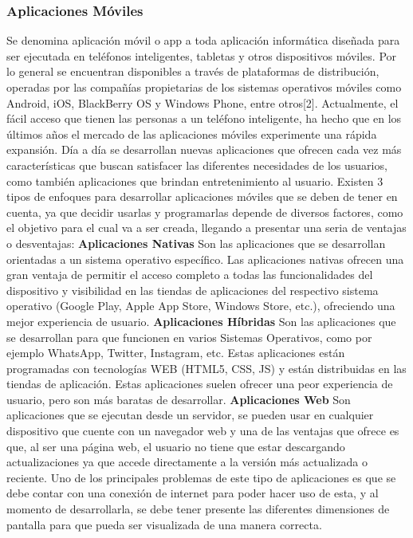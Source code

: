 \documentclass[12pt,letterpaper,openany]{book}
\begin{document}
\subsubsection{Aplicaciones Móviles}
Se denomina aplicación móvil o app a toda aplicación informática diseñada para ser ejecutada en teléfonos inteligentes, tabletas y otros dispositivos móviles. Por lo general se encuentran disponibles a través de plataformas de distribución, operadas por las compañías propietarias de los sistemas operativos móviles como Android, iOS, BlackBerry OS y Windows Phone, entre otros[2].
\vspace{5mm}\newline
Actualmente, el fácil acceso que tienen las personas a un teléfono inteligente, ha hecho que en los últimos años el mercado de las aplicaciones móviles experimente una rápida expansión. Día a día se desarrollan nuevas aplicaciones que ofrecen cada vez más características que buscan satisfacer las diferentes necesidades de los usuarios, como también aplicaciones que brindan entretenimiento al usuario.
\vspace{5mm}\newline
Existen 3 tipos de enfoques para desarrollar aplicaciones móviles que se deben de tener en cuenta, ya que decidir usarlas y programarlas depende de diversos factores, como el objetivo para el cual va a ser creada, llegando a presentar una seria de ventajas o desventajas:
\vspace{5mm}\newline
\textbf{Aplicaciones Nativas}\newline
Son las aplicaciones que se desarrollan orientadas a un sistema operativo específico. Las aplicaciones nativas ofrecen una gran ventaja de permitir el acceso completo a todas las funcionalidades del dispositivo y visibilidad en las tiendas de aplicaciones del respectivo sistema operativo (Google Play, Apple App Store, Windows Store, etc.), ofreciendo una mejor experiencia de usuario.
\vspace{5mm}\newline
\textbf{Aplicaciones Híbridas}\newline
Son las aplicaciones que se desarrollan para que funcionen en varios Sistemas Operativos, como por ejemplo WhatsApp, Twitter, Instagram, etc. Estas aplicaciones están programadas con tecnologías WEB (HTML5, CSS, JS) y están distribuidas en las tiendas de aplicación.
Estas aplicaciones suelen ofrecer una peor experiencia de usuario, pero son más baratas de desarrollar.
\vspace{5mm}\newline
\textbf{Aplicaciones Web}\newline
Son aplicaciones que se ejecutan desde un servidor, se pueden usar en cualquier dispositivo que cuente con un navegador web y una de las ventajas que ofrece es que, al ser una página web, el usuario no tiene que estar descargando actualizaciones ya que accede directamente a la versión más actualizada o reciente.
Uno de los principales problemas de este tipo de aplicaciones es que se debe contar con una conexión de internet para poder hacer uso de esta, y al momento de desarrollarla, se debe tener presente las diferentes dimensiones de pantalla para que pueda ser visualizada de una manera correcta.
\end{document}
